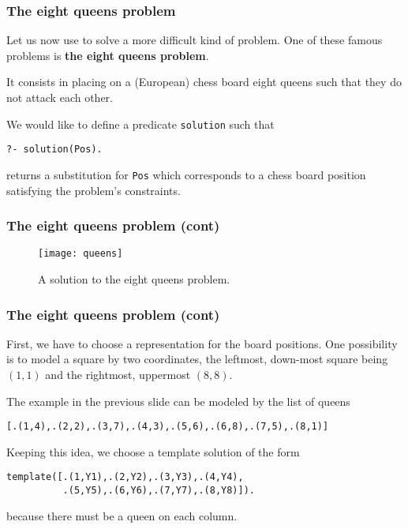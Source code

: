 
%
\begin{frame}[containsverbatim]
\frametitle{The eight queens problem}

Let us now use \Prolog to solve a more difficult kind of problem. One
of these famous problems is \textbf{the eight queens problem}.

\bigskip

It consists in placing on a (European) chess board eight queens such
that they do not attack each other.

\bigskip

We would like to define a predicate \texttt{solution} such that
{\small
\begin{verbatim}
?- solution(Pos).
\end{verbatim}
}
returns a substitution for \texttt{Pos} which corresponds to a
chess board position satisfying the problem's constraints.

\end{frame}

%
\begin{frame}
\frametitle{The eight queens problem (cont)}

\begin{figure}
\centering
\texttt{[image: queens]}
\caption{A solution to the eight queens problem.}
\end{figure}

\end{frame}

%
\begin{frame}[containsverbatim]
\frametitle{The eight queens problem (cont)}

First, we have to choose a representation for the board positions. One
possibility is to model a square by two coordinates, the leftmost,
down-most square being \((1,1)\) and the rightmost, uppermost
\((8,8)\).

\bigskip

The example in the previous slide can be modeled by the list of
queens
{\small
\begin{verbatim}
[.(1,4),.(2,2),.(3,7),.(4,3),.(5,6),.(6,8),.(7,5),.(8,1)]
\end{verbatim}
}
Keeping this idea, we choose a template solution  of the form
{\footnotesize
\begin{verbatim}
template([.(1,Y1),.(2,Y2),.(3,Y3),.(4,Y4),
          .(5,Y5),.(6,Y6),.(7,Y7),.(8,Y8)]).
\end{verbatim}
}
because there must be a queen on each column.

\end{frame}

